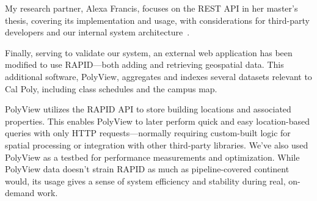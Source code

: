 My research partner, Alexa Francis, focuses on the REST API in her master's thesis, covering its implementation and usage, with considerations for third-party developers and our internal system architecture~\cite{Francis}.

\label{polyview_intro}
Finally, serving to validate our system, an external web application has been modified to use RAPID---both adding and retrieving geospatial data. This additional software, PolyView, aggregates and indexes several datasets relevant to Cal Poly, including class schedules and the campus map.

PolyView utilizes the RAPID API to store building locations and associated properties. This enables PolyView to later perform quick and easy location-based queries with only HTTP requests---normally requiring custom-built logic for spatial processing or integration with other third-party libraries. We've also used PolyView as a testbed for performance measurements and optimization. While PolyView data doesn't strain RAPID as much as pipeline-covered continent would, its usage gives a sense of system efficiency and stability during real, on-demand work.

